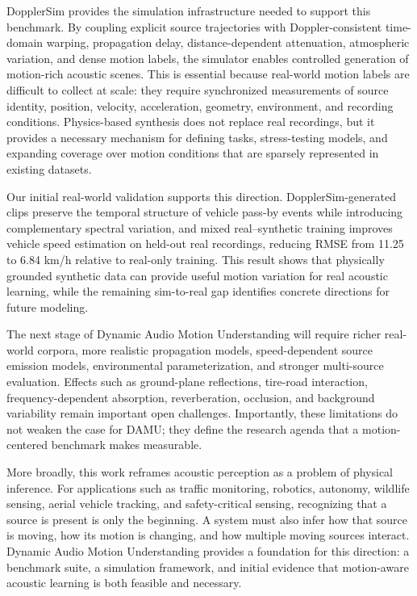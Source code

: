 \documentclass{article}
\begin{document}
DopplerSim provides the simulation infrastructure needed to support this benchmark. By coupling explicit source trajectories with Doppler-consistent time-domain warping, propagation delay, distance-dependent attenuation, atmospheric variation, and dense motion labels, the simulator enables controlled generation of motion-rich acoustic scenes. This is essential because real-world motion labels are difficult to collect at scale: they require synchronized measurements of source identity, position, velocity, acceleration, geometry, environment, and recording conditions. Physics-based synthesis does not replace real recordings, but it provides a necessary mechanism for defining tasks, stress-testing models, and expanding coverage over motion conditions that are sparsely represented in existing datasets.

Our initial real-world validation supports this direction. DopplerSim-generated clips preserve the temporal structure of vehicle pass-by events while introducing complementary spectral variation, and mixed real--synthetic training improves vehicle speed estimation on held-out real recordings, reducing RMSE from 11.25 to 6.84 km/h relative to real-only training. This result shows that physically grounded synthetic data can provide useful motion variation for real acoustic learning, while the remaining sim-to-real gap identifies concrete directions for future modeling.

The next stage of Dynamic Audio Motion Understanding will require richer real-world corpora, more realistic propagation models, speed-dependent source emission models, environmental parameterization, and stronger multi-source evaluation. Effects such as ground-plane reflections, tire-road interaction, frequency-dependent absorption, reverberation, occlusion, and background variability remain important open challenges. Importantly, these limitations do not weaken the case for DAMU; they define the research agenda that a motion-centered benchmark makes measurable.

More broadly, this work reframes acoustic perception as a problem of physical inference. For applications such as traffic monitoring, robotics, autonomy, wildlife sensing, aerial vehicle tracking, and safety-critical sensing, recognizing that a source is present is only the beginning. A system must also infer how that source is moving, how its motion is changing, and how multiple moving sources interact. Dynamic Audio Motion Understanding provides a foundation for this direction: a benchmark suite, a simulation framework, and initial evidence that motion-aware acoustic learning is both feasible and necessary.
\end{document}
